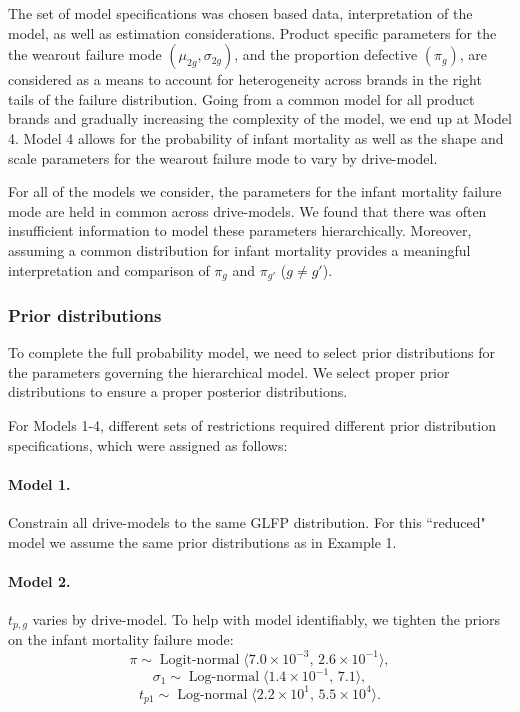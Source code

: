 \documentclass[12pt]{article}
\newcommand{\op}{\operatorname}
\begin{document}
The set of model specifications was chosen based data, interpretation of the model, as well as estimation considerations.  Product specific parameters for the the wearout failure mode $(\mu_{2g},\sigma_{2g})$, and the proportion defective $(\pi_g)$, are considered as a means to account for heterogeneity across brands in the right tails of the failure distribution.  Going from a common model for all product brands and gradually increasing the complexity of the model, we end up at Model 4.  Model 4 allows for the probability of infant mortality as well as the shape and scale parameters for the wearout failure mode to vary by drive-model.

For all of the models we consider, the parameters for the infant mortality failure mode are held in common across drive-models.  We found that there was often insufficient information to model these parameters hierarchically.  Moreover, assuming a common distribution for infant mortality provides a meaningful interpretation and comparison of $\pi_g$ and $\pi_{g'}$ ($g \neq g'$). 

\subsubsection{Prior distributions}
\label{sec:Prior distributions}
To complete the full probability model, we need to select prior distributions for the parameters governing the hierarchical model. We select proper prior distributions to ensure a proper posterior distributions.

For Models 1-4, different sets of restrictions required different prior distribution specifications, which were assigned as follows:

\paragraph{Model 1.} Constrain all drive-models to the same GLFP distribution. For this ``reduced" model we assume the same prior distributions as in Example 1.

\paragraph{Model 2.} $t_{p,g}$ varies by drive-model. To help with model identifiably, we tighten the priors on the infant mortality failure mode:
$$ \pi \sim \op{Logit-normal}\langle 7.0\times 10^{-3},\, 2.6 \times 10^{-1} \rangle,$$
$$\sigma_1 \sim \op{Log-normal}\langle 1.4 \times 10^{-1},\, 7.1\rangle,$$ 
$$t_{p1} \sim \op{Log-normal} \langle 2.2 \times 10^1,\, 5.5 \times 10^{4} \rangle.$$
\end{document}
